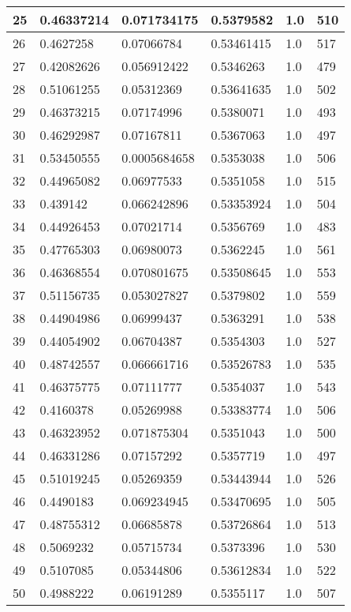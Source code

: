 \begin{longtable}{|l|l|l|l|l|l|}
25 & 0.46337214 & 0.071734175 & 0.5379582 & 1.0 & 510 \\ \hline 
26 & 0.4627258 & 0.07066784 & 0.53461415 & 1.0 & 517 \\ \hline 
27 & 0.42082626 & 0.056912422 & 0.5346263 & 1.0 & 479 \\ \hline 
28 & 0.51061255 & 0.05312369 & 0.53641635 & 1.0 & 502 \\ \hline 
29 & 0.46373215 & 0.07174996 & 0.5380071 & 1.0 & 493 \\ \hline 
30 & 0.46292987 & 0.07167811 & 0.5367063 & 1.0 & 497 \\ \hline 
31 & 0.53450555 & 0.0005684658 & 0.5353038 & 1.0 & 506 \\ \hline 
32 & 0.44965082 & 0.06977533 & 0.5351058 & 1.0 & 515 \\ \hline 
33 & 0.439142 & 0.066242896 & 0.53353924 & 1.0 & 504 \\ \hline 
34 & 0.44926453 & 0.07021714 & 0.5356769 & 1.0 & 483 \\ \hline 
35 & 0.47765303 & 0.06980073 & 0.5362245 & 1.0 & 561 \\ \hline 
36 & 0.46368554 & 0.070801675 & 0.53508645 & 1.0 & 553 \\ \hline 
37 & 0.51156735 & 0.053027827 & 0.5379802 & 1.0 & 559 \\ \hline 
38 & 0.44904986 & 0.06999437 & 0.5363291 & 1.0 & 538 \\ \hline 
39 & 0.44054902 & 0.06704387 & 0.5354303 & 1.0 & 527 \\ \hline 
40 & 0.48742557 & 0.066661716 & 0.53526783 & 1.0 & 535 \\ \hline 
41 & 0.46375775 & 0.07111777 & 0.5354037 & 1.0 & 543 \\ \hline 
42 & 0.4160378 & 0.05269988 & 0.53383774 & 1.0 & 506 \\ \hline 
43 & 0.46323952 & 0.071875304 & 0.5351043 & 1.0 & 500 \\ \hline 
44 & 0.46331286 & 0.07157292 & 0.5357719 & 1.0 & 497 \\ \hline 
45 & 0.51019245 & 0.05269359 & 0.53443944 & 1.0 & 526 \\ \hline 
46 & 0.4490183 & 0.069234945 & 0.53470695 & 1.0 & 505 \\ \hline 
47 & 0.48755312 & 0.06685878 & 0.53726864 & 1.0 & 513 \\ \hline 
48 & 0.5069232 & 0.05715734 & 0.5373396 & 1.0 & 530 \\ \hline 
49 & 0.5107085 & 0.05344806 & 0.53612834 & 1.0 & 522 \\ \hline 
50 & 0.4988222 & 0.06191289 & 0.5355117 & 1.0 & 507 \\ \hline 
\end{longtable}
